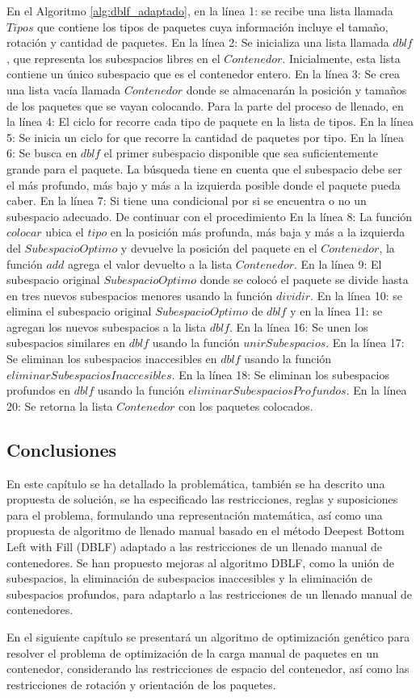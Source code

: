 En el Algoritmo \ref{alg:dblf_adaptado}, en la línea 1: se recibe una lista llamada $Tipos$ que contiene los tipos de paquetes cuya información incluye el tamaño, rotación y cantidad de paquetes. En la línea 2: Se inicializa una lista llamada $dblf$, que representa los subespacios libres en el $Contenedor$. Inicialmente, esta lista contiene un único subespacio que es el contenedor entero. En la línea 3: Se crea una lista vacía llamada $Contenedor$ donde se almacenarán la posición y tamaños de los paquetes que se vayan colocando. Para la parte del proceso de llenado, en la línea 4: El ciclo for recorre cada tipo de paquete en la lista de tipos. En la línea 5: Se inicia un ciclo for que recorre la cantidad de paquetes por tipo. En la línea 6: Se busca en $dblf$ el primer subespacio disponible que sea suficientemente grande para el paquete. La búsqueda tiene en cuenta que el subespacio debe ser el más profundo, más bajo y más a la izquierda posible donde el paquete pueda caber. En la línea 7: Si tiene una condicional por si se encuentra o no un subespacio adecuado. De continuar con el procedimiento En la línea 8: La función $colocar$ ubica el $tipo$ en la posición más profunda, más baja y más a la izquierda del $SubespacioOptimo$ y devuelve la posición del paquete en el $Contenedor$, la función $add$ agrega el valor devuelto a la lista $Contenedor$. En la línea 9: El subespacio original $SubespacioOptimo$ donde se colocó el paquete se divide hasta en tres nuevos subespacios menores usando la función $dividir$. En la línea 10: se elimina el subespacio original $SubespacioOptimo$ de $dblf$ y en la línea 11: se agregan los nuevos subespacios a la lista $dblf$. En la línea 16: Se unen los subespacios similares en $dblf$ usando la función $unirSubespacios$. En la línea 17: Se eliminan los subespacios inaccesibles en $dblf$ usando la función $eliminarSubespaciosInaccesibles$. En la línea 18: Se eliminan los subespacios profundos en $dblf$ usando la función $eliminarSubespaciosProfundos$. En la línea 20: Se retorna la lista $Contenedor$ con los paquetes colocados.


\subsection{Conclusiones}

En este capítulo se ha detallado la problemática, también se ha descrito una propuesta de solución, se ha especificado las restricciones, reglas y suposiciones para el problema, formulando una representación matemática, así como una propuesta de algoritmo de llenado manual basado en el método Deepest Bottom Left with Fill (DBLF) adaptado a las restricciones de un llenado manual de contenedores. Se han propuesto mejoras al algoritmo DBLF, como la unión de subespacios, la eliminación de subespacios inaccesibles y la eliminación de subespacios profundos, para adaptarlo a las restricciones de un llenado manual de contenedores.

En el siguiente capítulo se presentará un algoritmo de optimización genético para resolver el problema de optimización de la carga manual de paquetes en un contenedor, considerando las restricciones de espacio del contenedor, así como las restricciones de rotación y orientación de los paquetes.
